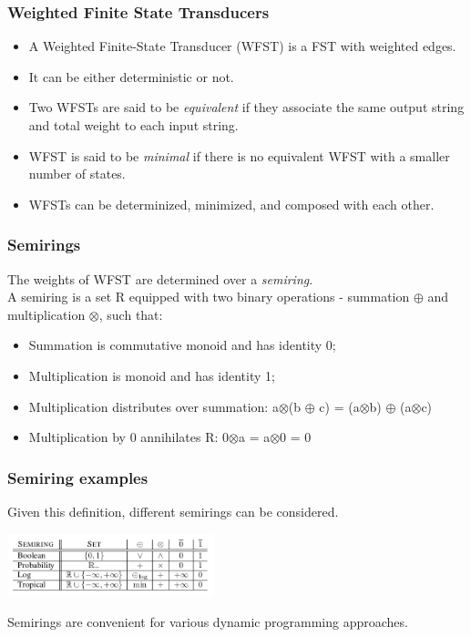 \documentclass{beamer}
\newcommand{\<}{\langle}
\renewcommand{\>}{\rangle}
\begin{document}
\begin{frame}
  \frametitle{Weighted Finite State Transducers}
\begin{itemize}
\item A Weighted Finite-State Transducer (WFST) is a FST with weighted edges.
\item It can be either deterministic or not.
\item Two WFSTs are said to be \textit{equivalent} if they associate the same output string and total weight to each input string.
\item WFST is said to be \textit{minimal} if there is no equivalent WFST with a smaller number of states.
\item WFSTs can be determinized, minimized, and composed with each other.
\end{itemize}
\end{frame}
\begin{frame}
\frametitle{Semirings}
The weights of WFST are determined over a \textit{semiring}.\\
A semiring is a set R equipped with two binary operations - summation $\oplus$ and multiplication $\otimes$, such that:
\begin{itemize}
\item Summation is commutative monoid and has identity 0;
\item Multiplication is monoid and has identity 1;
\item Multiplication distributes over summation: a$\otimes$(b $\oplus$ c) = (a$\otimes$b) $\oplus$ (a$\otimes$c)
\item Multiplication by 0 annihilates R: 0$\otimes$a = a$\otimes$0 = 0
\end{itemize}
\end{frame}
\begin{frame}
\frametitle{Semiring examples}
Given this definition, different semirings can be considered.
\begin{center}
\includegraphics[width=6cm]{semiring-example-5.png}\\
\end{center}
Semirings are convenient for various dynamic programming approaches.
\end{frame}
\end{document}
